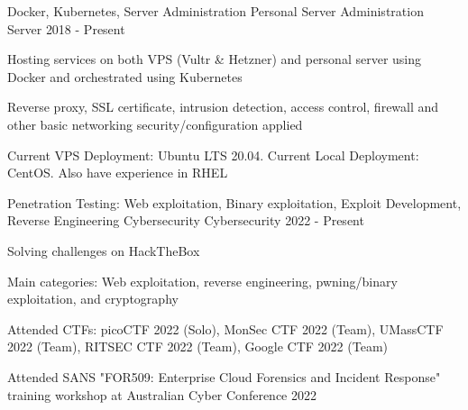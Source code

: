 

\begin{cventries}

  \cventry
    {Docker, Kubernetes, Server Administration}
    {Personal Server Administration}
    {Server}
    {2018 - Present}
    {
      \begin{cvitems}
        \item{Hosting services on both VPS (Vultr \& Hetzner) and personal server using Docker and orchestrated using Kubernetes}
        \item{Reverse proxy, SSL certificate, intrusion detection, access control, firewall and other basic networking security/configuration applied}
        \item{Current VPS Deployment: Ubuntu LTS 20.04. Current Local Deployment: CentOS. Also have experience in RHEL}
      \end{cvitems}
    }



  \cventry
    {Penetration Testing: Web exploitation, Binary exploitation, Exploit Development, Reverse Engineering}
    {Cybersecurity}
    {Cybersecurity}
    {2022 - Present}
    {
      \begin{cvitems}
        \item{Solving challenges on HackTheBox}
        \item{Main categories: Web exploitation, reverse engineering, pwning/binary exploitation, and cryptography}
        \item{Attended CTFs: picoCTF 2022 (Solo), MonSec CTF 2022 (Team), UMassCTF 2022 (Team), RITSEC CTF 2022 (Team), Google CTF 2022 (Team)}
        \item{Attended SANS "FOR509: Enterprise Cloud Forensics and Incident Response" training workshop at Australian Cyber Conference 2022}
      \end{cvitems}
    }

\end{cventries}
